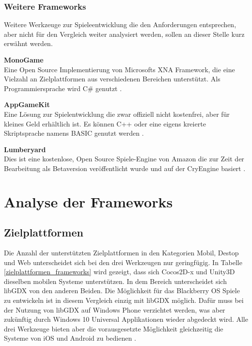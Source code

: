 \subsection{Weitere Frameworks}
Weitere Werkzeuge zur Spieleentwicklung die den Anforderungen entsprechen, aber nicht für den Vergleich weiter analysiert werden, sollen an dieser Stelle kurz erwähnt werden.

\bigskip
\textbf{MonoGame}\\
Eine Open Source Implementierung von Microsofts XNA Framework, die eine Vielzahl an Zielplattformen aus verschiedenen Bereichen unterstützt. Als Programmiersprache wird C\# genutzt \citep{monogame}. 

\bigskip
\textbf{AppGameKit}\\
Eine Lösung zur Spielentwicklung die zwar offiziell nicht kostenfrei, aber für kleines Geld erhältlich ist. Es können C++ oder eine eigens kreierte Skriptsprache namens BASIC genutzt werden \citep{appgamekit}. 

\bigskip
\textbf{Lumberyard}\\
Dies ist eine kostenlose, Open Source Spiele-Engine von Amazon die zur Zeit der Bearbeitung als Betaversion veröffentlicht wurde und auf der CryEngine basiert \citep{lumberyard}.


\chapter{Analyse der Frameworks}
\label{chapter:Analyse_der_Frameworks}


\section{Zielplattformen}
Die Anzahl der unterstützten Zielplattformen in den Kategorien Mobil, Destop und Web unterscheidet sich bei den drei Werkzeugen nur geringfügig. In Tabelle \ref{zielplattformen_frameworks} wird gezeigt, dass sich Cocos2D-x und Unity3D dieselben mobilen Systeme unterstützen. In dem Bereich unterscheidet sich libGDX von den anderen Beiden. Die Möglichkeit für das Blackberry OS Spiele zu entwickeln ist in diesem Vergleich einzig mit libGDX möglich. Dafür muss bei der Nutzung von libGDX auf Windows Phone verzichtet werden, was aber zukünftig durch Windows 10 Universal Applikationen wieder abgedeckt wird. Alle drei Werkzeuge bieten aber die vorausgesetzte Möglichkeit gleichzeitig die Systeme von iOS und Android zu bedienen \citep{unity_public_relations,cocos2d_main_features,libGDX_main_features}. 


